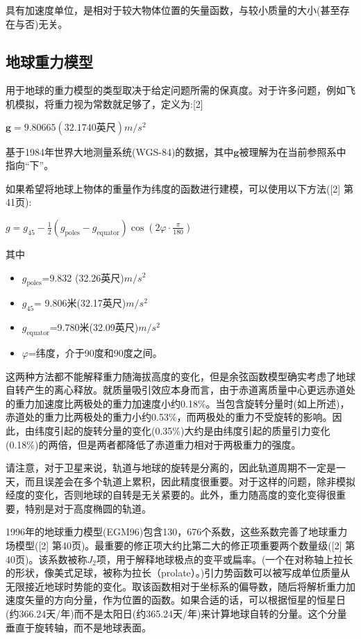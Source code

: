 具有加速度单位，是相对于较大物体位置的矢量函数，与较小质量的大小(甚至存在与否)无关。

\subsection{地球重力模型}

用于地球的重力模型的类型取决于给定问题所需的保真度。对于许多问题，例如飞机模拟，将重力视为常数就足够了，定义为:[2]

$\mathbf{g} =9.80665(32.1740\text{英尺}) m/s^2$

基于1984年世界大地测量系统(WGS-84)的数据，其中$\mathbf{g}$被理解为在当前参照系中指向“下”。

如果希望将地球上物体的重量作为纬度的函数进行建模，可以使用以下方法([2] 第41页):

$g = g_{45} - \frac{1}{2} \left( g_{\text{poles}} - g_{\text{equator}} \right) \cos \left( 2 \varphi \cdot \frac{\pi}{180} \right)$

其中

\begin{itemize}
\item $g_\text{poles}$=9.832 (32.26{英尺})$m/s^2$
\item $g_{45}$= 9.806米(32.17英尺)$m/s^2$
\item $g_\text{equator}$=9.780米(32.09英尺)$m/s^2$
\item $\varphi$=纬度，介于90度和90度之间。
\end{itemize}

这两种方法都不能解释重力随海拔高度的变化，但是余弦函数模型确实考虑了地球自转产生的离心释放。就质量吸引效应本身而言，由于赤道离质量中心更远赤道处的重力加速度比两极处的重力加速度小约0.18\%。当包含旋转分量时(如上所述)，赤道处的重力比两极处的重力小约0.53\%，而两极处的重力不受旋转的影响。因此，由纬度引起的旋转分量的变化(0.35\%)大约是由纬度引起的质量引力变化(0.18\%)的两倍，但是两者都降低了赤道重力相对于两极重力的强度。

请注意，对于卫星来说，轨道与地球的旋转是分离的，因此轨道周期不一定是一天，而且误差会在多个轨道上累积，因此精度很重要。对于这样的问题，除非模拟经度的变化，否则地球的自转是无关紧要的。此外，重力随高度的变化变得很重要，特别是对于高度椭圆的轨道。

1996年的地球重力模型(EGM96)包含130，676个系数，这些系数完善了地球重力场模型([2] 第40页)。最重要的修正项大约比第二大的修正项重要两个数量级([2] 第40页)。该系数被称$J_2$项，用于解释地球极点的变平或扁率。(一个在对称轴上拉长的形状，像美式足球，被称为拉长（prolate）。)引力势函数可以被写成单位质量从无限接近地球时势能的变化。取该函数相对于坐标系的偏导数，随后将解析重力加速度矢量的方向分量，作为位置的函数。如果合适的话，可以根据恒星的恒星日(约366.24天/年)而不是太阳日(约365.24天/年)来计算地球自转的分量。这个分量垂直于旋转轴，而不是地球表面。

